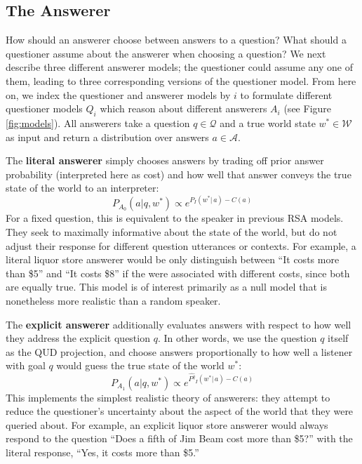 \documentclass[12pt, floatsintext, jou]{apa6}
\begin{document}
\subsection{The Answerer}

How should an answerer choose between answers to a question? What should a questioner assume about the answerer when choosing a question? We next describe three different answerer models; the questioner could assume any one of them, leading to three corresponding versions of the questioner model. From here on, we index the questioner and answerer models by $i$ to formulate different questioner models $Q_i$ which reason about different answerers $A_i$ (see Figure \ref{fig:models}).
All answerers take a question $q \in \mathcal{Q}$ and a true world state $w^* \in \mathcal{W}$ as input and return a distribution over answers $a \in \mathcal{A}$.
%

The \textbf{literal answerer} simply chooses answers by trading off prior answer probability (interpreted here as cost) and how well that answer conveys the true state of the world to an interpreter:
%
$$P_{A_0}(a | q,w^*) \propto e^{P_I(w^* | \,a) - C(a)} $$
%
For a fixed question, this is equivalent to the speaker in previous RSA models. They seek to maximally informative about the state of the world, but do not adjust their response for different question utterances or contexts. For example, a literal liquor store answerer would be only distinguish between ``It costs more than \$5'' and ``It costs \$8'' if the were associated with different costs, since both are equally true. This model is of interest primarily as a null model that is nonetheless more realistic than a random speaker. 
%

The \textbf{explicit answerer} additionally evaluates answers with respect to how well they address the explicit question $q$. In other words, we use the question $q$ itself as the QUD projection, and choose answers proportionally to how well a listener with goal $q$ would guess the true state of the world $w^*$:
%
$$P_{A_1}(a | q, w^*) \propto e^{\widehat{P^q}_I(w^* | \, a) - C(a)}$$
This implements the simplest realistic theory of answerers: they attempt to reduce the questioner's uncertainty about the aspect of the world that they were queried about. For example, an explicit liquor store answerer would always respond to the question ``Does a fifth of Jim Beam cost more than \$5?'' with the literal response, ``Yes, it costs more than \$5.''
\end{document}
